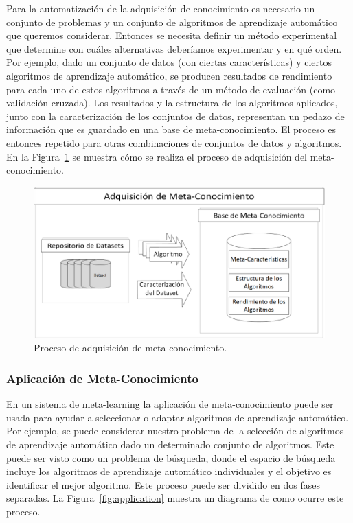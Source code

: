 Para la automatización de la adquisición de conocimiento es necesario un
conjunto de problemas y un conjunto de algoritmos de aprendizaje automático
que queremos considerar. Entonces se necesita definir un método experimental
que determine con cuáles alternativas deberíamos experimentar y en qué orden.
Por ejemplo, dado un conjunto de datos (con ciertas características) y
ciertos algoritmos de aprendizaje automático, se producen resultados de
rendimiento para cada uno de estos algoritmos a través de un método de
evaluación (como validación cruzada). Los resultados y la estructura de los
algoritmos aplicados, junto con la caracterización de los conjuntos de datos,
representan un pedazo de información que es guardado en una base de
meta-conocimiento. El proceso es entonces repetido para otras combinaciones de
conjuntos de datos y algoritmos. 
En la Figura~\ref{fig:adquisition} se muestra cómo se realiza el proceso de
adquisición del meta-conocimiento.

\begin{figure}[H]
    \centering
    \includegraphics[scale=.5]{Figures/adquisition.png}
    \caption{Proceso de adquisición de meta-conocimiento. }
    \label{fig:adquisition}
\end{figure}

\subsubsection{Aplicación de Meta-Conocimiento}

En un sistema de meta-learning la aplicación de meta-conocimiento puede ser
usada para ayudar a seleccionar o adaptar algoritmos de aprendizaje automático.
Por ejemplo, se puede considerar nuestro problema de la selección de algoritmos
de aprendizaje automático dado un determinado conjunto de algoritmos. Este
puede ser visto como un problema de búsqueda, donde el espacio de búsqueda
incluye los algoritmos de aprendizaje automático individuales y el objetivo es
identificar el mejor algoritmo. Este proceso puede ser dividido en dos fases
separadas. La Figura~\ref{fig:application} muestra un diagrama de como ocurre
este proceso.

